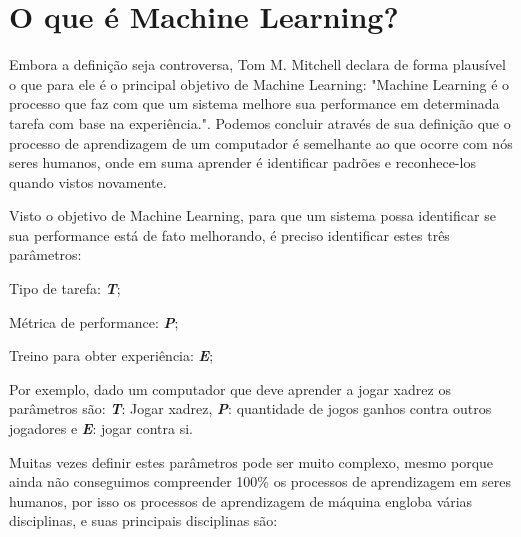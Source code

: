 \section{O que é Machine Learning?}
\label{sec:oqueemachinelearning}

Embora a definição seja controversa, Tom M. Mitchell declara de forma plausível o que para ele é o principal objetivo de Machine Learning: "Machine Learning é o processo que faz com que um sistema melhore sua performance em determinada tarefa com base na experiência."\cite{Tom}. Podemos concluir através de sua definição que o processo de aprendizagem de um computador é semelhante ao que ocorre com nós seres humanos, onde em suma aprender é identificar padrões e reconhece-los quando vistos novamente.

Visto o objetivo de Machine Learning, para que um sistema possa identificar se sua performance está de fato melhorando, é preciso identificar estes três parâmetros:
 \begin{alineascomponto}
	\item Tipo de tarefa: \textbf{\textit{T}};
	\item Métrica de performance: \textbf{\textit{P}};
	\item Treino para obter experiência: \textbf{\textit{E}};			
\end{alineascomponto}
Por exemplo, dado um computador que deve aprender a jogar xadrez os parâmetros são: \textbf{\textit{T}}: Jogar xadrez, \textbf{\textit{P}}: quantidade de jogos ganhos contra outros jogadores e
\textbf{\textit{E}}: jogar contra si.

Muitas vezes definir estes parâmetros pode ser muito complexo, mesmo porque ainda não conseguimos compreender 100\% os processos
de aprendizagem em seres humanos, por isso os processos de aprendizagem de máquina engloba várias disciplinas, e suas principais disciplinas são: 
 
